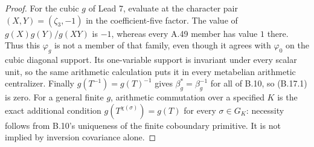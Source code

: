 \begin{proof}
For the cubic $g$ of Lead 7, evaluate at the character pair
$(X,Y)=(\zeta_3,-1)$ in the coefficient-five factor. The value of
$g(X)g(Y)/g(XY)$ is $-1$, whereas every A.49 member has value
$1$ there. Thus this $\varphi_g$ is not a member of that family,
even though it agrees with $\varphi_0$ on the cubic diagonal
support. Its one-variable support is invariant under every scalar
unit, so the same arithmetic calculation puts it in every
metabelian arithmetic centralizer. Finally
$g(T^{-1})=g(T)^{-1}$ gives
$\beta_g^*=\beta_g^{-1}$ for all of B.10, so (B.17.1) is zero.
For a general finite $g$, arithmetic commutation over a specified
$K$ is the exact additional condition
$g(T^{\chi(\sigma)})=g(T)$ for every $\sigma\in G_K$:
necessity follows from B.10's uniqueness of the finite coboundary
primitive. It is not implied by inversion covariance alone.
\end{proof}

